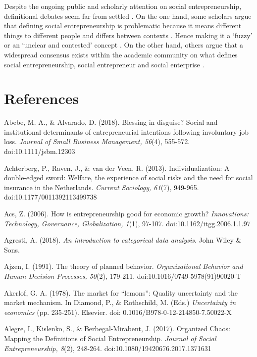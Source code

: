 \documentclass{article}
\begin{document}
  Despite the ongoing public and scholarly attention on social entrepreneurship, definitional debates seem far from settled \parencite{Saebi2019}. On the one hand, some scholars argue that defining social entrepreneurship is problematic because it means different things to different people and differs between contexts \parencite{Mair2010}. Hence making it a ‘fuzzy' \parencite{Choi2014} or an ‘unclear and contested' concept \parencite{Saebi2019}. On the other hand, others argue that a widespread consensus exists within the academic community on what defines social entrepreneurship, social entrepreneur and social enterprise \parencite{Alegre2017}.



\section{References}



Abebe, M. A., \& Alvarado, D. (2018). Blessing in disguise? Social and institutional determinants of entrepreneurial intentions following involuntary job loss. \emph{Journal of Small Business Management, 56}(4), 555-572. doi:10.1111/jsbm.12303

Achterberg, P., Raven, J., \& van der Veen, R. (2013). Individualization: A double-edged sword: Welfare, the experience of social risks and the need for social insurance in the Netherlands. \emph{Current Sociology, 61}(7), 949-965. doi:10.1177/0011392113499738

Acs, Z. (2006). How is entrepreneurship good for economic growth? \emph{Innovations: Technology, Governance, Globalization, 1}(1), 97-107. doi:10.1162/itgg.2006.1.1.97

Agresti, A. (2018). \emph{An introduction to categorical data analysis}. John Wiley \& Sons.

Ajzen, I. (1991). The theory of planned behavior. \emph{Organizational }\emph{Behavior}\emph{ and Human Decision Processes, 50}(2), 179-211. doi:10.1016/0749-5978(91)90020-T

Akerlof, G. A. (1978). The market for “lemons”: Quality uncertainty and the market mechanism. In Diamond, P., \& Rothschild, M. (Eds.) \emph{Uncertainty in economics }(pp. 235-251). Elsevier. doi: 0.1016/B978-0-12-214850-7.50022-X

Alegre, I., Kislenko, S., \& Berbegal-Mirabent, J. (2017). Organized Chaos: Mapping the Definitions of Social Entrepreneurship. \emph{Journal of Social Entrepreneurship, 8}(2), 248-264. doi:10.1080/19420676.2017.1371631
\end{document}
